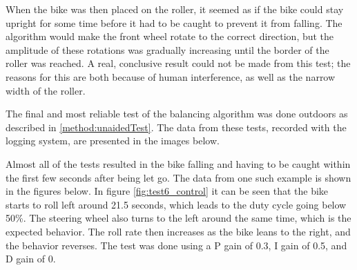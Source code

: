 When the bike was then placed on the roller, it seemed as if the bike could stay upright for some time before it had to be caught to prevent it from falling. The algorithm would make the front wheel rotate to the correct direction, but the amplitude of these rotations was gradually increasing until the border of the roller was reached. A real, conclusive result could not be made from this test; the reasons for this are both because of human interference, as well as the narrow width of the roller.

The final and most reliable test of the balancing algorithm was done outdoors as described in \ref{method:unaidedTest}. The data from these tests, recorded with the logging system, are presented in the images below.

Almost all of the tests resulted in the bike falling and having to be caught within the first few seconds after being let go. The data from one such example is shown in the figures below. In figure \ref{fig:test6_control} it can be seen that the bike starts to roll left around 21.5 seconds, which leads to the duty cycle going below 50\%. The steering wheel also turns to the left around the same time, which is the expected behavior. The roll rate then increases as the bike leans to the right, and the behavior reverses. The test was done using a P gain of 0.3, I gain of 0.5, and D gain of 0.


